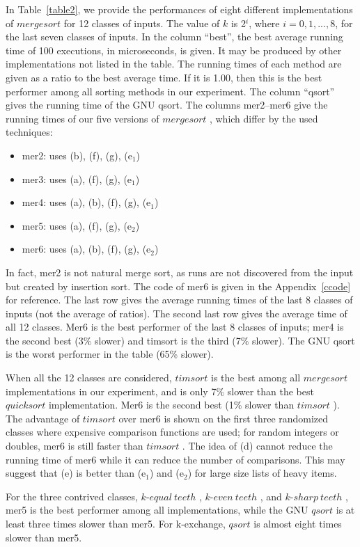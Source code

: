 \documentclass[AMA,STIX1COL]{WileyNJD-v2}
\newcommand{\keq}{$k$-$equal\ teeth$ }
\newcommand{\kev}{$k$-$even\ teeth$ }
\newcommand{\ksha}{$k$-$sharp\ teeth$ }
\newcommand{\qusort}{$quicksort$ }
\newcommand{\qsort}{$qsort$ }
\newcommand{\tsort}{$timsort$ }
\newcommand{\msort}{$mergesort$ }
\begin{document}
In Table~\ref{table2}, we provide the performances of eight different implementations of \msort for 12 classes of inputs. The value of $k$ is 2$^i$, where $i = 0, 1, ..., 8$, for the last seven classes of inputs. In the column “best”, the best average running time of 100 executions, in microseconds, is given. It may be produced by other implementations not listed in the table. The running times of each method are given as a ratio to the best average time. If it is 1.00, then this is the best performer among all sorting methods in our experiment. The column “qsort” gives the running time of the GNU qsort. The columns mer2–mer6 give the running times of our five versions of \msort, which differ by the used techniques:
\begin{itemize}
\item mer2: uses (b), (f), (g), (e$_1$)
\item mer3: uses (a), (f), (g), (e$_1$)
\item mer4: uses (a), (b), (f), (g), (e$_1$)
\item mer5: uses (a), (f), (g), (e$_2$)
\item mer6: uses (a), (b), (f), (g), (e$_2$)
\end{itemize}

In fact, mer2 is not natural merge sort, as runs are not discovered from the input but created by insertion sort. 
The code of mer6 is given in the Appendix~\ref{ccode} for reference.  
The last row gives the average running times of the last 8 classes of inputs (not the average of ratios). 
The second last row gives the average time of all 12 classes. 
Mer6 is the best performer of the last 8 classes of inputs; mer4 is the second best (3\% slower) and timsort is the third (7\% slower). 
The GNU qsort is the worst performer in the table (65\% slower).

When all the 12 classes are considered, \tsort is the best among all \msort implementations in our experiment, and is only 7\% slower than the best \qusort implementation. Mer6 is the second best (1\% slower than \tsort). 
The advantage of \tsort over mer6 is shown on the first three randomized classes where expensive comparison functions are used; for random integers or doubles, mer6 is still faster than \tsort. 
The idea of (d) cannot reduce the running time of mer6 while it can reduce the number of comparisons. 
This may suggest that (e) is better than (e$_1$) and (e$_2$) for large size lists of heavy items. 

For the three contrived classes, \keq, \kev, and \ksha, mer5 is the best performer among all implementations, while the GNU \qsort is at least three times slower than mer5. For k-exchange, \qsort is almost eight times slower than mer5.  
\end{document}
